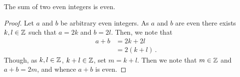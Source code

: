 \guard



\begin{prop}
\label{prop:sumOfEvenIsEven}
  The sum of two even integers is even.
\end{prop}
\begin{proof}
  Let $a$ and $b$ be arbitrary even integers.
  As $a$ and $b$ are even there exists $k,l\in\mathbb{Z}$ such that $a=2k$ and $b=2l$.
  Then, we note that
  \begin{align*}
    a + b &= 2k + 2l \\
          &= 2( k + l )\,.
  \end{align*}
  Though, as $k,l\in\mathbb{Z}$, $k+l\in\mathbb{Z}$, set $m=k+l$.
  Then we note that $m\in\mathbb{Z}$ and $a+b = 2m$, and whence $a+b$ is even.
\end{proof}
